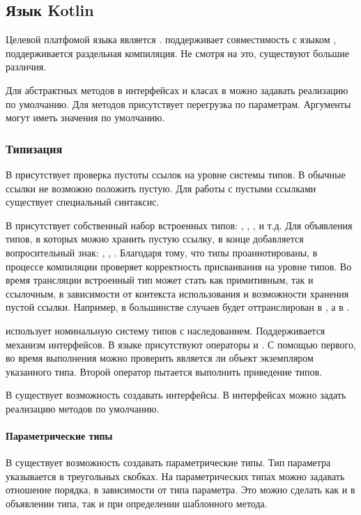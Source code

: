 \subsection{Язык Kotlin}

Целевой платфомой языка  является .  поддерживает совместимость с языком  \cite{kotlin:compatibility}, поддерживается раздельная компиляция. Не смотря на это, существуют большие различия.

Для абстрактных методов в интерфейсах и класах в  можно задавать реализацию по умолчанию. Для методов присутствует перегрузка по параметрам. Аргументы могут иметь значения по умолчанию.

\subsubsection{Типизация}
В  присутствует проверка пустоты ссылок на уровне системы типов. В обычные ссылки не возможно положить пустую. Для работы с пустыми ссылками существует специальный синтаксис.

В  присутствует собственный набор встроенных типов: , , , и т.д. Для объявления типов, в которых можно хранить пустую ссылку, в конце добавляется вопросительный знак: , , . Благодаря тому, что типы проаннотированы, в процессе компиляции  проверяет корректность присваивания на уровне типов. Во время трансляции встроенный тип может стать как примитивным, так и ссылочным, в зависимости от контекста использования и возможности хранения пустой ссылки. Например, в большинстве случаев  будет оттранслирован в , а  в .

 использует номинальную систему типов с наследованием. Поддерживается механизм интерфейсов. В языке присутствуют операторы  и . С помощью первого, во время выполнения можно проверить является ли объект экземпляром указанного типа. Второй оператор пытается выполнить приведение типов.

В  существует возможность создавать интерфейсы. В интерфейсах можно задать реализацию методов по умолчанию.

\paragraph{Параметрические типы}
В  существует возможность создавать параметрические типы. Тип параметра указывается в треугольных скобках. На параметрических типах можно задавать отношение порядка, в зависимости от типа параметра. Это можно сделать как и в объявлении типа, так и при определении шаблонного метода.
